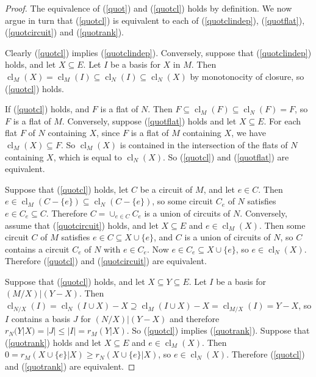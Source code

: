 \documentclass{amsart}
\theoremstyle{plain}
\theoremstyle{definition}
\DeclareMathOperator{\cl}{cl}
\newcommand{\con}{/}
\renewcommand{\le}{\leqslant}
\renewcommand{\ge}{\geqslant}
\renewcommand{\ss}{\subseteq}
\begin{document}
\begin{proof}
  The equivalence of (\ref{quot}) and (\ref{quotcl}) holds by definition. 
  We now argue in turn that (\ref{quotcl}) is equivalent to each of
  (\ref{quotclindep}), (\ref{quotflat}), (\ref{quotcircuit}) and (\ref{quotrank}). 
  
  Clearly (\ref{quotcl}) implies (\ref{quotclindep}). 
  Conversely, suppose that (\ref{quotclindep}) holds, and let $X \ss E$. 
  Let $I$ be a basis for $X$ in $M$. Then $\cl_M(X) = \cl_M(I) \ss \cl_N(I) \ss \cl_N(X)$ 
  by monotonocity of closure, so (\ref{quotcl}) holds. 
  
  If (\ref{quotcl}) holds, and $F$ is a flat of $N$. 
  Then $F \ss \cl_M(F) \ss \cl_N(F) = F$, so $F$ is a flat of $M$. 
  Conversely, suppose (\ref{quotflat}) holds and let $X \ss E$. 
  For each flat $F$ of $N$ containing $X$, since $F$ is a flat of $M$
  containing $X$, we have $\cl_M(X) \ss F$. So $\cl_M(X)$ is contained 
  in the intersection of the flats of $N$ containing $X$, which is equal to $\cl_N(X)$. 
  So (\ref{quotcl}) and (\ref{quotflat}) are equivalent. 

  Suppose that (\ref{quotcl}) holds, let $C$ be a circuit of $M$, and let $e \in C$. 
  Then $e \in \cl_M(C - \{e\}) \ss \cl_N(C - \{e\})$, so some circuit $C_e$ of $N$ 
  satisfies $e \in C_e \ss C$. Therefore $C = \cup_{e \in C} C_e$ is a union of circuits of $N$.
  Conversely, assume that (\ref{quotcircuit}) holds, and let $X \subseteq E$ and $e \in \cl_M(X)$. 
  Then some circuit $C$ of $M$ satisfies $e \in C \ss X \cup \{e\}$, and $C$ is a union of 
  circuits of $N$, so $C$ contains a circuit $C_e$ of $N$ with $e \in C_e$. 
  Now $e \in C_e \ss X \cup \{e\}$, so $e \in \cl_N(X)$. 
  Therefore (\ref{quotcl}) and (\ref{quotcircuit}) are equivalent. 
  
  Suppose that (\ref{quotcl}) holds, and let $X \ss Y \ss E$. 
  Let $I$ be a basis for $(M \con X) | (Y - X)$. 
  Then $\cl_{N \con X}(I) = \cl_N(I \cup X) - X \supseteq \cl_M(I \cup X) - X = \cl_{M \con X}(I) = Y-X$, 
  so $I$ contains a basis $J$ for $(N \con X) | (Y -X)$ and therefore 
  $r_N(Y | X) = |J| \le |I| = r_M(Y | X)$. So (\ref{quotcl}) implies (\ref{quotrank}). 
  Suppose that (\ref{quotrank}) holds and let $X \ss E$ and $e \in \cl_M(X)$. 
  Then $0 = r_M(X \cup \{e\} | X) \ge r_N(X \cup \{e\} | X)$, so $e \in \cl_N(X)$.
  Therefore (\ref{quotcl}) and (\ref{quotrank}) are equivalent. 


\end{proof}
\end{document}
